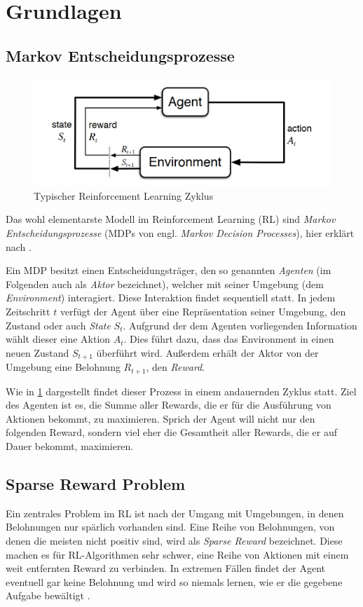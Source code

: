 \section{Grundlagen}
\label{sec:basics}

\subsection{Markov Entscheidungsprozesse}
\label{sec:reinforcement}
\begin{figure}[h]
\includegraphics[width=\textwidth, keepaspectratio=true]{images/mdp.png}
\caption{Typischer Reinforcement Learning Zyklus} \label{img:rl_cycle}
\end{figure}
Das wohl elementarste Modell im Reinforcement Learning (RL) sind \textit{Markov Entscheidungsprozesse} (MDPs von engl. \textit{Markov Decision Processes}), hier erklärt nach \cite{deeplizard_markov_decision_processes}.

Ein MDP besitzt einen Entscheidungsträger, den so genannten \textit{Agenten} (im Folgenden auch als \textit{Aktor} bezeichnet), welcher mit seiner Umgebung (dem \textit{Environment}) interagiert. Diese Interaktion findet sequentiell statt. In jedem Zeitschritt $ t $ verfügt der Agent über eine Repräsentation seiner Umgebung, den Zustand oder auch \textit{State} $ S_t $. Aufgrund der dem Agenten vorliegenden Information wählt dieser eine Aktion $ A_t $. Dies führt dazu, dass das Environment in einen neuen Zustand $ S_{t+1} $ überführt wird. Außerdem erhält der Aktor von der Umgebung eine Belohnung $ R_{t+1} $, den \textit{Reward}.

Wie in \ref{img:rl_cycle} dargestellt findet dieser Prozess in einem andauernden Zyklus statt. Ziel des Agenten ist es, die Summe aller Rewards, die er für die Ausführung von Aktionen bekommt, zu maximieren. Sprich der Agent will nicht nur den folgenden Reward, sondern viel eher die Gesamtheit aller Rewards, die er auf Dauer bekommt, maximieren.

\subsection{Sparse Reward Problem}
\label{sec:sparse_reward}
Ein zentrales Problem im RL ist nach \cite{hare2019dealing} der Umgang mit Umgebungen, in denen Belohnungen nur spärlich vorhanden sind. Eine Reihe von Belohnungen, von denen die meisten nicht positiv sind, wird als \textit{Sparse Reward} bezeichnet. Diese machen es für RL-Algorithmen sehr schwer, eine Reihe von Aktionen mit einem weit entfernten Reward zu verbinden. In extremen Fällen findet der Agent eventuell gar keine Belohnung und wird so niemals lernen, wie er die gegebene Aufgabe bewältigt \cite{hare2019dealing}.

